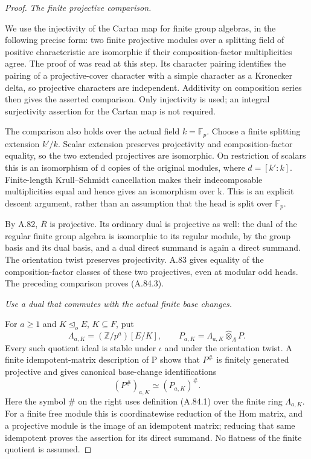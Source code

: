 \begin{proof}
\emph{The finite projective comparison.}\par
We use the injectivity of the Cartan map for finite group algebras,
in the following precise form: two finite projective modules over a
splitting field of positive characteristic are isomorphic if their
composition-factor multiplicities agree. The proof of
\citet[Proposition~10.2.1, Theorem~10.2.2, and Corollary~10.2.4]{AWebb2016}
was read at this step. Its character pairing identifies the pairing of
a projective-cover character with a simple character as a Kronecker
delta, so projective characters are independent. Additivity on
composition series then gives the asserted comparison. Only
injectivity is used; an integral surjectivity assertion for the
Cartan map is not required.

The comparison also holds over the actual field \(k=\mathbb F_p\).
Choose a finite splitting extension \(k'/k\). Scalar extension
preserves projectivity and composition-factor equality, so the two
extended projectives are isomorphic. On restriction of scalars this
is an isomorphism of d copies of the original modules, where
\(d=[k':k]\). Finite-length Krull--Schmidt cancellation makes their
indecomposable multiplicities equal and hence gives an isomorphism
over k. This is an explicit descent argument, rather than an
assumption that the head is split over \(\mathbb F_p\).

By A.82, \(\overline R\) is projective. Its ordinary dual is
projective as well: the dual of the regular finite group algebra is
isomorphic to its regular module, by the group basis and its dual
basis, and a dual direct summand is again a direct summand.
The orientation twist preserves projectivity. A.83 gives equality
of the composition-factor classes of these two projectives, even
at modular odd heads. The preceding comparison proves (A.84.3).

\emph{Use a dual that commutes with the actual finite base changes.}\par
For \(a\geq1\) and \(K\trianglelefteq_o E\), \(K\subseteq F\), put
\[
 \Lambda_{a,K}=(\mathbb Z/p^a)[E/K],\qquad
 P_{a,K}=\Lambda_{a,K}\widehat\otimes_\Lambda P.
 \tag{A.84.5}
\]
Every such quotient ideal is stable under \(\iota\) and under the
orientation twist. A finite idempotent-matrix description of P shows
that \(P^\#\) is finitely generated projective and gives canonical
base-change identifications
\[
 (P^\#)_{a,K}\simeq(P_{a,K})^\#.
 \tag{A.84.6}
\]
Here the symbol \(\#\) on the right uses definition (A.84.1)
over the finite ring \(\Lambda_{a,K}\).
For a finite free module this is coordinatewise reduction of
the Hom matrix, and a projective module is the image of an idempotent
matrix; reducing that same idempotent proves the assertion for its
direct summand. No flatness of the finite quotient is assumed.


\end{proof}
